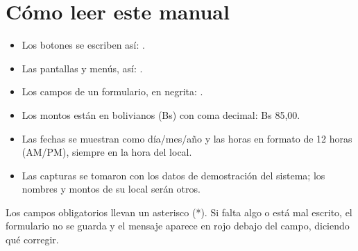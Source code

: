 \section{Cómo leer este manual}

\begin{itemize}
  \item Los botones se escriben así: .
  \item Las pantallas y menús, así: .
  \item Los campos de un formulario, en negrita: .
  \item Los montos están en bolivianos (Bs) con coma decimal: Bs 85,00.
  \item Las fechas se muestran como día/mes/año y las horas en formato de 12 horas (AM/PM), siempre en la hora del local.
  \item Las capturas se tomaron con los datos de demostración del sistema; los nombres y montos de su local serán otros.
\end{itemize}

\begin{consejo}
Los campos obligatorios llevan un asterisco (*). Si falta algo o está mal escrito, el formulario no se guarda y el mensaje aparece en rojo debajo del campo, diciendo qué corregir.
\end{consejo}
